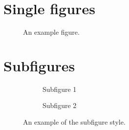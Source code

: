 \documentclass[11pt]{article}
\begin{document}
\section{Single figures}

\blindtext
\blindtext

\begin{figure}[h!]
\centering 

\caption{An example figure.}
\end{figure}

\blindtext
\blindtext

\section{Subfigures}

\blindtext
\blindtext

\begin{figure}[h!]
\centering
    \begin{subfigure}[b]{0.49\textwidth}
    \centering
    
    \caption{Subfigure 1}
    \end{subfigure}\hfill
    \begin{subfigure}[b]{0.49\textwidth}
    \centering
    
    \caption{Subfigure 2}
    \end{subfigure}
\caption{An example of the subfigure style.}
\end{figure}

\blindtext
\end{document}
